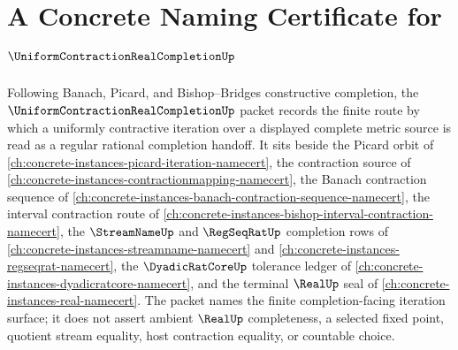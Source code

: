 \chapter{A Concrete Naming Certificate for $\UniformContractionRealCompletionUp$}
\label{ch:concrete-instances-uniform-contraction-real-completion-namecert}

Following Banach, Picard, and Bishop--Bridges constructive completion, the $\UniformContractionRealCompletionUp$ packet records the finite route by which a uniformly contractive iteration over a displayed complete metric source is read as a regular rational completion handoff. It sits beside the Picard orbit of \autoref{ch:concrete-instances-picard-iteration-namecert}, the contraction source of \autoref{ch:concrete-instances-contractionmapping-namecert}, the Banach contraction sequence of \autoref{ch:concrete-instances-banach-contraction-sequence-namecert}, the interval contraction route of \autoref{ch:concrete-instances-bishop-interval-contraction-namecert}, the $\StreamNameUp$ and $\RegSeqRatUp$ completion rows of \autoref{ch:concrete-instances-streamname-namecert} and \autoref{ch:concrete-instances-regseqrat-namecert}, the $\DyadicRatCoreUp$ tolerance ledger of \autoref{ch:concrete-instances-dyadicratcore-namecert}, and the terminal $\RealUp$ seal of \autoref{ch:concrete-instances-real-namecert}. The packet names the finite completion-facing iteration surface; it does not assert ambient $\RealUp$ completeness, a selected fixed point, quotient stream equality, host contraction equality, or countable choice.

